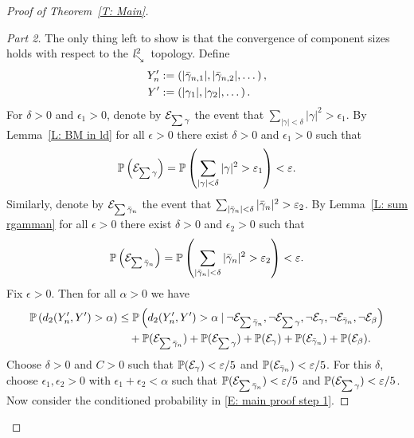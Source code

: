 \begin{proof}[Proof of Theorem~\ref{T: Main}]
	\begin{proof}[Part 2]
	The only thing left to show is that the convergence of component sizes holds with respect to the $\mathit{l}^2_{\searrow}$~topology.
	Define
	\begin{equation}
	\begin{aligned}
	Y'_n &:= \left(|\bar{\gamma}_{n,1}|, |\bar{\gamma}_{n,2}|, \dots\right), \\
	Y' &:= \left(|\gamma_1|, |\gamma_2|, \dots\right).
	\end{aligned}
	\end{equation}
	For $\delta > 0$ and $\epsilon_1 > 0$, denote by $\mathcal{E}_{\sum\gamma}$ the event that $\sum_{|\gamma| < \delta}|\gamma|^2 > \epsilon_1$.
	By Lemma~\ref{L: BM in ld} for all $\epsilon > 0$ there exist $\delta > 0$ and $\epsilon_1 > 0$ such that
	\begin{equation*}
	\mathbb{P}\left(\mathcal{E}_{\sum\gamma}\right) = \mathbb{P}\left( \sum_{|\gamma| < \delta}|\gamma|^2 > \varepsilon_1 \right) < \varepsilon.
	\end{equation*}
	Similarly, denote by $\mathcal{E}_{\sum\bar{\gamma}_n}$ the event that $\sum_{|\bar{\gamma}_n| < \delta}|\bar{\gamma}_n|^2 > \varepsilon_2$.
	By Lemma~\ref{L: sum rgamman} for all $\epsilon > 0$ there exist $\delta > 0$ and $\epsilon_2 > 0$ such that
	\begin{equation*}
	\mathbb{P}\left(\mathcal{E}_{\sum\bar{\gamma}_n}\right) = \mathbb{P}\left( \sum_{|\bar{\gamma}_n| < \delta}|\bar{\gamma}_n|^2 > \varepsilon_2 \right) < \varepsilon.
	\end{equation*}
	Fix $\epsilon > 0$. 
	Then for all $\alpha > 0$ we have 
	\begin{equation} \label{E: main proof step 1}
	\begin{aligned}
	\mathbb{P}\left( d_{2}(Y'_n, Y') > \alpha\right)
	&\leq \mathbb{P}\left( d_{2}(Y'_n, Y') > \alpha \: | \: 
	\neg\mathcal{E}_{\sum\bar{\gamma}_n}, \neg\mathcal{E}_{\sum\gamma}, \neg\mathcal{E}_{\gamma}, \neg\mathcal{E}_{\bar{\gamma}_n}, \neg\mathcal{E}_{\beta}\right) \\
	&\quad + \mathbb{P}(\mathcal{E}_{\sum\bar{\gamma}_n}) + \mathbb{P}(\mathcal{E}_{\sum\gamma}) + \mathbb{P}(\mathcal{E}_{\gamma}) + \mathbb{P}(\mathcal{E}_{\bar{\gamma}_n}) + \mathbb{P}(\mathcal{E}_{\beta}).
	\end{aligned}
	\end{equation}
	Choose $\delta > 0$ and $C > 0$ such that $\mathbb{P}(\mathcal{E}_{\gamma}) < \varepsilon / 5$ and $\mathbb{P}(\mathcal{E}_{\bar{\gamma}_n}) < \varepsilon / 5$.
	For this $\delta$, choose $\epsilon_1, \epsilon_2 > 0$ with $\epsilon_1 + \epsilon_2 < \alpha$
	such that $\mathbb{P}(\mathcal{E}_{\sum\bar{\gamma}_n}) < \varepsilon / 5$ and $\mathbb{P}(\mathcal{E}_{\sum\gamma}) < \varepsilon / 5$.
	Now consider the conditioned probability in \eqref{E: main proof step 1}.

\end{proof}
\end{proof}
